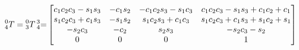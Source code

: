 \documentclass{exam}
\begin{document}
\begin{questions}
\begin{parts}
\begin{equation}
  \prescript{0}{4}T = \prescript{0}{3}T\prescript{3}{4} = \begin{bmatrix}
    c_{1}c_{2}c_{3}-s_{1}s_{3} & -c_{1}s_{2} & -c_{1}c_{2}s_{3}-s_{1}c_{3} & c_{1}c_{2}c_{3}-s_{1}s_{3}+c_{1}c_{2}+c_{1} \\
    s_{1}c_{2}c_{3}+c_{1}s_{3} & -s_{1}s_{2} & s_{1}c_{2}s_{3}+c_{1}c_{3}  & s_{1}c_{2}c_{3}+c_{1}s_{3}+s_{1}c_{2}+s_{1} \\
    -s_{2}c_{3}                & -c_{2}      &  s_{2}s_{3}                 & -s_{2}c_{3}-s_{2}                           \\
    0                          & 0           & 0                           & 1                                           \\
                                                          \end{bmatrix}
\end{equation}


\end{parts}

\end{questions}
\end{document}
